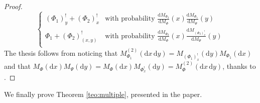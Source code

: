 \documentclass[11pt,a4paper,oneside]{article}
\newcommand{\dd}{\mathrm d}
\theoremstyle{definition}
\theoremstyle{remark}
\begin{document}
\begin{proof}
\[\begin{cases}
       (\Phi_1)^!_{y} +  (\Phi_2)^!_{x} &\text{with probability }   \displaystyle{\frac{\dd M_{\Phi_2}}{\dd M_{\Phi}} (x)  \frac{\dd M_{\Phi_1}}{\dd M_{\Psi}} (y)}\\
        \Phi_1+ (\Phi_2)^!_{(x, y)} &\text{with probability }  \displaystyle{\frac{\dd M_{\Phi_2}}{\dd M_{\Phi}} (x) \frac{\dd M_{(\Phi_2)^!_x}}{\dd M_{\Psi}} (y)} \\
    \end{cases}
\]
The thesis follows from noticing that $M_{\Phi_1}^{(2)}(\dd x \, \dd y) = M_{(\Phi_1)^!_{x}}(\dd y) M_{\Phi_1}(\dd x)$ and that $M_{\Phi} (\dd x)M_{\Psi}(\dd y) = M_{\Phi} (\dd x)M_{\Phi_x^{!}}(\dd y) = M_{\Phi}^{(2)} (\dd x \, \dd y)$, thanks to \citep[Proposition 3.3.9]{BaBlaKa}. 
\end{proof} 

We finally  prove Theorem \ref{teo:multiple}, presented in the paper.
\end{document}
